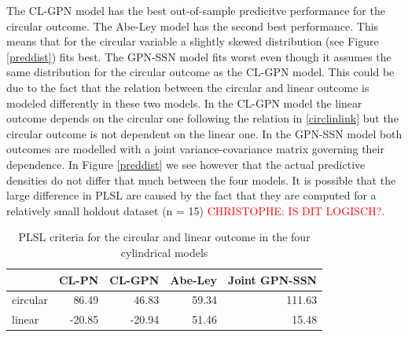 \documentclass[11pt,]{article}
\begin{document}
The CL-GPN model has the best out-of-sample predicitve performance for
the circular outcome. The Abe-Ley model has the second best performance.
This means that for the circular variable a slightly skewed distribution
(see Figure \ref{preddist}) fits best. The GPN-SSN model fits worst even
though it assumes the same distribution for the circular outcome as the
CL-GPN model. This could be due to the fact that the relation between
the circular and linear outcome is modeled differently in these two
models. In the CL-GPN model the linear outcome depends on the circular
one following the relation in \eqref{circlinlink} but the circular
outcome is not dependent on the linear one. In the GPN-SSN model both
outcomes are modelled with a joint variance-covariance matrix governing
their dependence. In Figure \ref{preddist} we see however that the
actual predictive densities do not differ that much between the four
models. It is possible that the large difference in PLSL are caused by
the fact that they are computed for a relatively small holdout dataset
(n = 15) \textcolor{red}{CHRISTOPHE: IS DIT LOGISCH?}.

\begin{table}

\caption{\label{tab:ModelFit}PLSL criteria for the circular and linear outcome in the four cylindrical models}
\centering
\begin{tabular}[t]{lrrrr}
\toprule
  & CL-PN & CL-GPN & Abe-Ley & Joint GPN-SSN\\
\midrule
circular & 86.49 & 46.83 & 59.34 & 111.63\\
linear & -20.85 & -20.94 & 51.46 & 15.48\\
\bottomrule
\end{tabular}
\end{table}
\end{document}
